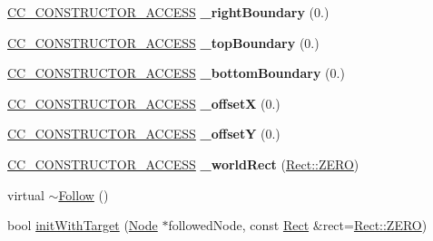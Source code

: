 \begin{DoxyCompactItemize}
\item 
\mbox{\label{classFollow_a8fee41024e7aa9790ef089cb24eba765}} 
\hyperlink{_2cocos2d_2cocos_2base_2ccConfig_8h_a25ef1314f97c35a2ed3d029b0ead6da0}{C\+C\+\_\+\+C\+O\+N\+S\+T\+R\+U\+C\+T\+O\+R\+\_\+\+A\+C\+C\+E\+SS} {\bfseries \+\_\+right\+Boundary} (0.)
\item 
\mbox{\label{classFollow_a8d17be8940842ea54cd6ea8bfe90c973}} 
\hyperlink{_2cocos2d_2cocos_2base_2ccConfig_8h_a25ef1314f97c35a2ed3d029b0ead6da0}{C\+C\+\_\+\+C\+O\+N\+S\+T\+R\+U\+C\+T\+O\+R\+\_\+\+A\+C\+C\+E\+SS} {\bfseries \+\_\+top\+Boundary} (0.)
\item 
\mbox{\label{classFollow_adaa4a25ca4b860e0de117d03d8c4285f}} 
\hyperlink{_2cocos2d_2cocos_2base_2ccConfig_8h_a25ef1314f97c35a2ed3d029b0ead6da0}{C\+C\+\_\+\+C\+O\+N\+S\+T\+R\+U\+C\+T\+O\+R\+\_\+\+A\+C\+C\+E\+SS} {\bfseries \+\_\+bottom\+Boundary} (0.)
\item 
\mbox{\label{classFollow_a302e7cbb0b36e60af23653453e630a1a}} 
\hyperlink{_2cocos2d_2cocos_2base_2ccConfig_8h_a25ef1314f97c35a2ed3d029b0ead6da0}{C\+C\+\_\+\+C\+O\+N\+S\+T\+R\+U\+C\+T\+O\+R\+\_\+\+A\+C\+C\+E\+SS} {\bfseries \+\_\+offsetX} (0.)
\item 
\mbox{\label{classFollow_ae51fac2d10075944998612c0045801d0}} 
\hyperlink{_2cocos2d_2cocos_2base_2ccConfig_8h_a25ef1314f97c35a2ed3d029b0ead6da0}{C\+C\+\_\+\+C\+O\+N\+S\+T\+R\+U\+C\+T\+O\+R\+\_\+\+A\+C\+C\+E\+SS} {\bfseries \+\_\+offsetY} (0.)
\item 
\mbox{\label{classFollow_aa5b6cdec6fa350e2be761b0de40ca192}} 
\hyperlink{_2cocos2d_2cocos_2base_2ccConfig_8h_a25ef1314f97c35a2ed3d029b0ead6da0}{C\+C\+\_\+\+C\+O\+N\+S\+T\+R\+U\+C\+T\+O\+R\+\_\+\+A\+C\+C\+E\+SS} {\bfseries \+\_\+world\+Rect} (\hyperlink{classRect_a590be46e60027b2ca0f62a457f91a83e}{Rect\+::\+Z\+E\+RO})
\item 
virtual \hyperlink{classFollow_ad525d890c104b47d89374871d408b184}{$\sim$\+Follow} ()
\item 
bool \hyperlink{classFollow_a71644134a18ece1b4367910d952872f6}{init\+With\+Target} (\hyperlink{classNode}{Node} $\ast$followed\+Node, const \hyperlink{classRect}{Rect} \&rect=\hyperlink{classRect_a590be46e60027b2ca0f62a457f91a83e}{Rect\+::\+Z\+E\+RO})

\end{DoxyCompactItemize}
